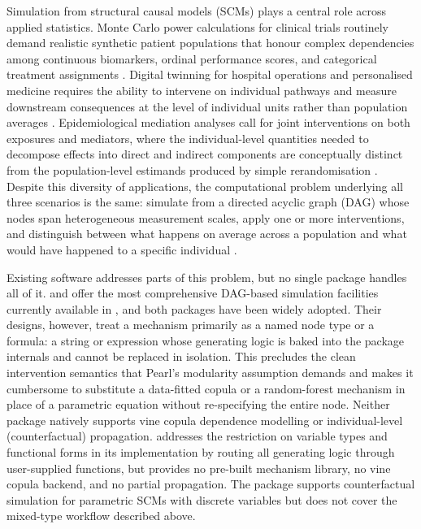 \documentclass[article]{jss}
\begin{document}
Simulation from structural causal models (SCMs) plays a central role across
applied statistics. Monte Carlo power calculations for clinical trials routinely
demand realistic synthetic patient populations that honour complex dependencies
among continuous biomarkers, ordinal performance scores, and categorical treatment
assignments \citep{morris2019using, burton2006design}. Digital twinning for hospital
operations and personalised medicine requires the ability to intervene on individual
pathways and measure downstream consequences at the level of individual units rather
than population averages \citep{laubenbacher2024digital}. Epidemiological mediation
analyses call for joint interventions on both exposures and mediators, where the
individual-level quantities needed to decompose effects into direct and indirect
components \citep{vanderweele2015explanation, pearl2001direct} are conceptually
distinct from the population-level estimands produced by simple rerandomisation
\citep{robins1992identifiability}. Despite this diversity of applications, the
computational problem underlying all three scenarios is the same: simulate from a
directed acyclic graph (DAG) \citep{pearl2009causality, spirtes2000causation} whose
nodes span heterogeneous measurement scales, apply one or more interventions, and
distinguish between what happens on average across a population and what would have
happened to a specific individual \citep{rubin1974estimating, neyman1923}.

Existing software addresses parts of this problem, but no single package handles
all of it.  \citep{sofrygin2017simcausal} and
 \citep{denz2026simdag} offer the most comprehensive DAG-based
simulation facilities currently available in , and both packages have
been widely adopted. Their designs, however, treat a mechanism primarily as a
named node type or a formula: a string or expression whose generating logic is
baked into the package internals and cannot be replaced in isolation. This
precludes the clean intervention semantics that Pearl's modularity assumption
\citep{pearl2009causality} demands and makes it cumbersome to substitute a
data-fitted copula or a random-forest mechanism in place of a parametric equation
without re-specifying the entire node. Neither package natively supports vine
copula dependence modelling or individual-level (counterfactual) propagation.
 \citep{alhajj2023dagsim} addresses the restriction on variable types
and functional forms in its  implementation by routing all
generating logic through user-supplied functions, but provides no pre-built
mechanism library, no vine copula backend, and no partial propagation. The
 package  \citep{tikka2024r6causal} supports
counterfactual simulation for parametric SCMs with discrete variables but does not
cover the mixed-type workflow described above.
\end{document}
